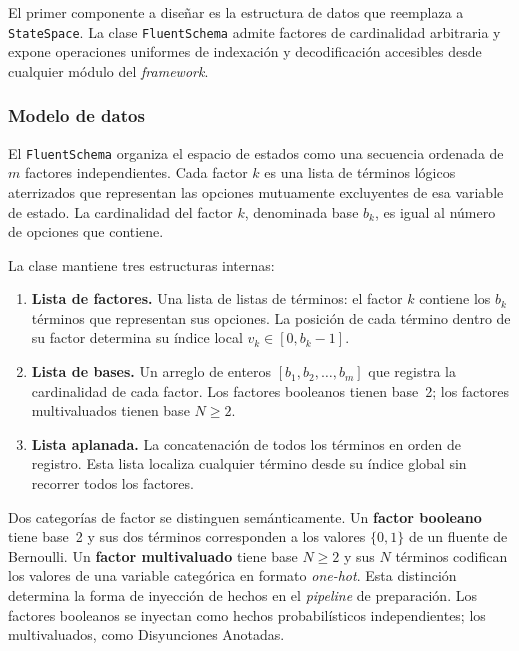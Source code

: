 El primer componente a diseñar es la estructura de datos que reemplaza a
\texttt{StateSpace}. La clase \texttt{FluentSchema} admite factores de
cardinalidad arbitraria y expone operaciones uniformes de indexación y
decodificación accesibles desde cualquier módulo del \textit{framework}.

\subsubsection{Modelo de datos}
\label{sec:di-fluentschema-modelo}

El \texttt{FluentSchema} organiza el espacio de estados como una secuencia ordenada
de $m$ factores independientes. Cada factor $k$ es una lista de términos lógicos
aterrizados que representan las opciones mutuamente excluyentes de esa variable de
estado. La cardinalidad del factor $k$, denominada base $b_k$, es igual al número
de opciones que contiene.

La clase mantiene tres estructuras internas:

\begin{enumerate}
    \item \textbf{Lista de factores.} Una lista de listas de términos: el factor $k$
        contiene los $b_k$ términos que representan sus opciones. La posición de
        cada término dentro de su factor determina su índice local
        $v_k \in [0, b_k - 1]$.

    \item \textbf{Lista de bases.} Un arreglo de enteros $[b_1, b_2, \ldots, b_m]$
        que registra la cardinalidad de cada factor. Los factores booleanos tienen
        base~2; los factores multivaluados tienen base $N \geq 2$.

    \item \textbf{Lista aplanada.} La concatenación de todos los términos en orden
        de registro. Esta lista localiza cualquier término desde su índice global
        sin recorrer todos los factores.
\end{enumerate}

Dos categorías de factor se distinguen semánticamente. Un \textbf{factor booleano}
tiene base~2 y sus dos términos corresponden a los valores $\{0, 1\}$ de un fluente
de Bernoulli. Un \textbf{factor multivaluado} tiene base $N \geq 2$ y sus $N$
términos codifican los valores de una variable categórica en formato
\textit{one-hot}. Esta distinción determina la forma de inyección de hechos en
el \textit{pipeline} de preparación. Los factores booleanos se inyectan como
hechos probabilísticos independientes; los multivaluados, como Disyunciones
Anotadas.

